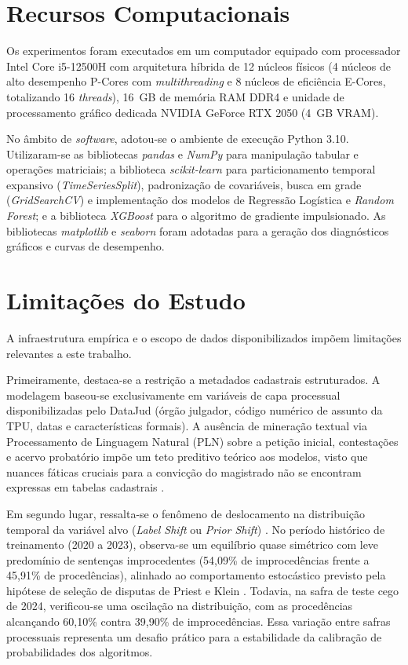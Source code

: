 \documentclass[conference]{IEEEtran}
\begin{document}
\section{Recursos Computacionais}
Os experimentos foram executados em um computador equipado com processador Intel Core i5-12500H com arquitetura híbrida de 12 núcleos físicos (4 núcleos de alto desempenho P-Cores com \textit{multithreading} e 8 núcleos de eficiência E-Cores, totalizando 16 \textit{threads}), 16~GB de memória RAM DDR4 e unidade de processamento gráfico dedicada NVIDIA GeForce RTX 2050 (4~GB VRAM).

No âmbito de \textit{software}, adotou-se o ambiente de execução Python 3.10. Utilizaram-se as bibliotecas \textit{pandas} e \textit{NumPy} para manipulação tabular e operações matriciais; a biblioteca \textit{scikit-learn} \cite{pedregosa2011} para particionamento temporal expansivo (\textit{TimeSeriesSplit}), padronização de covariáveis, busca em grade (\textit{GridSearchCV}) e implementação dos modelos de Regressão Logística e \textit{Random Forest}; e a biblioteca \textit{XGBoost} \cite{chen2016} para o algoritmo de gradiente impulsionado. As bibliotecas \textit{matplotlib} e \textit{seaborn} foram adotadas para a geração dos diagnósticos gráficos e curvas de desempenho.

\section{Limitações do Estudo}
A infraestrutura empírica e o escopo de dados disponibilizados impõem limitações relevantes a este trabalho.

Primeiramente, destaca-se a restrição a metadados cadastrais estruturados. A modelagem baseou-se exclusivamente em variáveis de capa processual disponibilizadas pelo DataJud (órgão julgador, código numérico de assunto da TPU, datas e características formais). A ausência de mineração textual via Processamento de Linguagem Natural (PLN) sobre a petição inicial, contestações e acervo probatório impõe um teto preditivo teórico aos modelos, visto que nuances fáticas cruciais para a convicção do magistrado não se encontram expressas em tabelas cadastrais \cite{bertalan2020}.

Em segundo lugar, ressalta-se o fenômeno de deslocamento na distribuição temporal da variável alvo (\textit{Label Shift} ou \textit{Prior Shift}) \cite{izbicki2020}. No período histórico de treinamento (2020 a 2023), observa-se um equilíbrio quase simétrico com leve predomínio de sentenças improcedentes (54,09\% de improcedências frente a 45,91\% de procedências), alinhado ao comportamento estocástico previsto pela hipótese de seleção de disputas de Priest e Klein \cite{priest1984}. Todavia, na safra de teste cego de 2024, verificou-se uma oscilação na distribuição, com as procedências alcançando 60,10\% contra 39,90\% de improcedências. Essa variação entre safras processuais representa um desafio prático para a estabilidade da calibração de probabilidades dos algoritmos.
\end{document}
